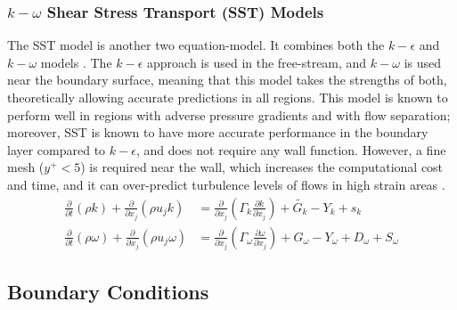 \subsubsection{$k-\omega$ Shear Stress Transport (SST) Models}
The SST model is another two equation-model. It combines both the $k-\epsilon$ and $k-\omega$ models \cite{Andersson2011Turbulent-flowModelling}\cite{Ansys2006ModelingFlows}.  The $k-\epsilon$ approach is used in the free-stream, and $k-\omega$ is used near the boundary surface, meaning that this model takes the strengths of both, theoretically allowing accurate predictions in all regions. This model is known to perform well in regions with adverse pressure gradients and with flow separation; moreover, SST is known to have more accurate performance in the boundary layer compared to $k-\epsilon$, and does not require any wall function\cite{Andersson2011Turbulent-flowModelling}. However, a fine mesh ($y^+  < 5$) is required near the wall, which increases the computational cost and time, and it can over-predict turbulence levels of flows in high strain areas \cite{Andersson2011Turbulent-flowModelling}\cite{Ansys2006ModelingFlows}. \begin{align}
\frac{\partial }{\partial t}({\rho} k)+\frac{\partial}{\partial x_j}({\rho} {u}_j k) & = \frac{\partial}{\partial x_j} (\Gamma_{k} \frac{\partial k}{\partial x_j}) + \tilde{G_k} - Y_k +s_k \\
\frac{\partial}{\partial t}(\rho \omega)+\frac{\partial}{\partial x_j}({\rho} {u}_j \omega) & = \frac{\partial}{\partial x_j}(\Gamma_\omega \frac{\partial \omega}{\partial x_j}) + G_\omega - Y_\omega + D_\omega + S_\omega
\end{align} 

\subsection{Boundary Conditions}

